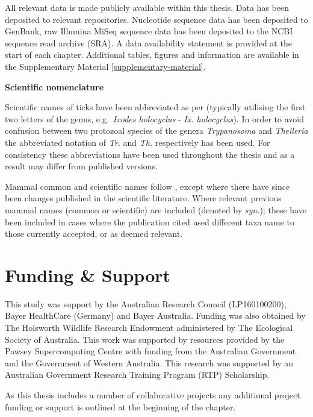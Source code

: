 \documentclass[a4paper, nobind]{templates/ociamthesis}
\begin{document}
All relevant data is made publicly available within this thesis.
Data has been deposited to relevant repositories.
Nucleotide sequence data has been deposited to GenBank, raw Illumina MiSeq sequence data has been deposited to the NCBI sequence read archive (SRA).
A data availability statement is provided at the start of each chapter.
Additional tables, figures and information are available in the Supplementary Material \ref{supplementary-material}.

\textbf{Scientific nomenclature}

Scientific names of ticks have been abbreviated as per \textcite{dantas-torresStandardizationAbbreviationsGenus2008} (typically utilising the first two letters of the genus, e.g.~\emph{Ixodes holocyclus} - \emph{Ix. holocyclus}).
In order to avoid confusion between two protozoal species of the genera \emph{Trypanosoma} and \emph{Theileria} the abbreviated notation of \emph{Tr.} and \emph{Th.} respectively has been used.
For consistency these abbreviations have been used throughout the thesis and as a result may differ from published versions.

Mammal common and scientific names follow \textcite{jacksonTaxonomyAustralianMammals2015}, except where there have since been changes published in the scientific literature.
Where relevant previous mammal names (common or scientific) are included (denoted by \emph{syn.}); these have been included in cases where the publication cited used different taxa name to those currently accepted, or as deemed relevant.

\hypertarget{funding-support}{%
\section*{Funding \& Support}\label{funding-support}}

This study was support by the Australian Research Council (LP160100200), Bayer HealthCare (Germany) and Bayer Australia.
Funding was also obtained by The Holsworth Wildlife Research Endowment administered by The Ecological Society of Australia.
This work was supported by resources provided by the Pawsey Supercomputing Centre with funding from the Australian Government and the Government of Western Australia.
This research was supported by an Australian Government Research Training Program (RTP) Scholarship.

As this thesis includes a number of collaborative projects any additional project funding or support is outlined at the beginning of the chapter.
\end{document}
